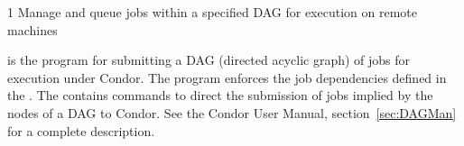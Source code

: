 \begin{ManPage}{\label{man-condor-submit-dag}}{1}
{Manage and queue jobs within a specified DAG for execution on remote machines}
\Synopsis {}


\Description

 is the program for submitting a DAG (directed
acyclic graph) of jobs for execution under Condor.
The program enforces the job dependencies defined
in the .
The  contains commands
to direct the submission of jobs implied by the nodes
of a DAG to Condor.
See the Condor User Manual, section~\ref{sec:DAGMan} for a complete
description.


\end{ManPage}
